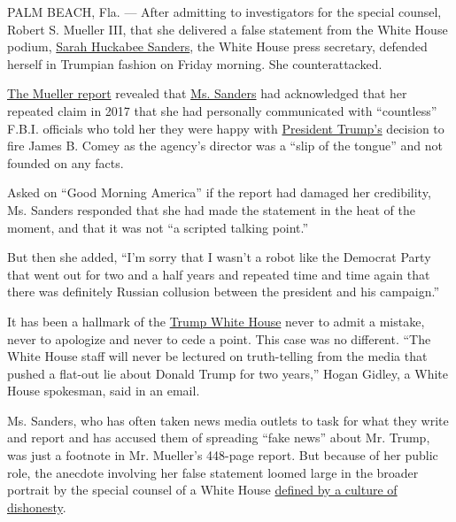 PALM BEACH, Fla. --- After admitting to investigators for the special
counsel, Robert S. Mueller III, that she delivered a false statement
from the White House podium,
\href{https://www.nytimes3xbfgragh.onion/2019/06/13/us/politics/sarah-sanders-leaving-white-house.html}{Sarah
Huckabee Sanders}, the White House press secretary, defended herself in
Trumpian fashion on Friday morning. She counterattacked.

\href{https://www.nytimes3xbfgragh.onion/interactive/2019/04/18/us/politics/mueller-report-document.html}{The
Mueller report} revealed that
\href{https://www.nytimes3xbfgragh.onion/2019/06/13/us/politics/sarah-sanders-leaving-white-house.html}{Ms.
Sanders} had acknowledged that her repeated claim in 2017 that she had
personally communicated with ``countless'' F.B.I. officials who told her
they were happy with
\href{https://www.nytimes3xbfgragh.onion/2019/06/13/us/politics/sarah-sanders-leaving-white-house.html}{President
Trump's} decision to fire James B. Comey as the agency's director was a
``slip of the tongue'' and not founded on any facts.

Asked on ``Good Morning America'' if the report had damaged her
credibility, Ms. Sanders responded that she had made the statement in
the heat of the moment, and that it was not ``a scripted talking
point.''

But then she added, ``I'm sorry that I wasn't a robot like the Democrat
Party that went out for two and a half years and repeated time and time
again that there was definitely Russian collusion between the president
and his campaign.''

It has been a hallmark of the
\href{https://www.nytimes3xbfgragh.onion/2019/06/13/us/politics/sarah-sanders-leaving-white-house.html}{Trump
White House} never to admit a mistake, never to apologize and never to
cede a point. This case was no different. ``The White House staff will
never be lectured on truth-telling from the media that pushed a flat-out
lie about Donald Trump for two years,'' Hogan Gidley, a White House
spokesman, said in an email.

Ms. Sanders, who has often taken news media outlets to task for what
they write and report and has accused them of spreading ``fake news''
about Mr. Trump, was just a footnote in Mr. Mueller's 448-page report.
But because of her public role, the anecdote involving her false
statement loomed large in the broader portrait by the special counsel of
a White House
\href{https://www.nytimes3xbfgragh.onion/2019/04/18/us/politics/white-house-mueller-report.html?action=click\&module=Spotlight\&pgtype=Homepage}{defined
by a culture of dishonesty}.

